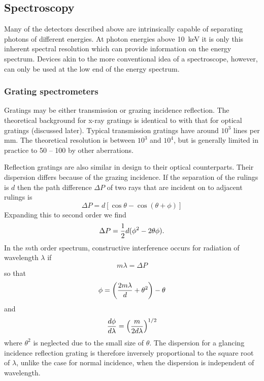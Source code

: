 \subsection{Spectroscopy}

Many of the detectors described above are intrinsically capable of separating 
photons of different energies. At photon energies above 10~keV it is only this
inherent spectral resolution which can provide information on the energy spectrum.
Devices akin to the more conventional idea of a spectroscope, however, can only 
be used at the low end of the energy spectrum.

\subsubsection{Grating spectrometers}
Gratings may be either transmission or grazing
incidence reflection. The theoretical background for x-ray gratings is identical
to with that for optical gratings (discussed later). Typical transmission
gratings have around $10^3$ lines per mm. The theoretical resolution is
between $10^3$ and $10^4$, but is generally limited in practice to 50 -- 100 by
other aberrations.

Reflection gratings are also similar in design to their optical counterparts.
Their dispersion differs because of the grazing incidence. If the separation
of the rulings is $d$ then the path difference $\Delta P$ of two rays that
are incident on to adjacent rulings is
\[
\Delta P=d[\cos\theta-\cos(\theta+\phi)]
\]
Expanding this to second order we find
\[
\Delta P={1\over 2}d(\phi^2-2\theta\phi).
\]
In the $m$th order spectrum, constructive interference occurs for radiation
of wavelength $\lambda$ if 
\[
m\lambda=\Delta P
\]
so that
\[
\phi=\left({{2m\lambda\over d}+\theta^2}\right)-\theta
\]
and
\[
{d\phi\over d\lambda}=\left({m\over 2d\lambda}\right)^{1/2}
\]
where $\theta^2$ is neglected due to the small size of $\theta$. The
dispersion for a glancing incidence reflection grating is therefore inversely
proportional to the square root of $\lambda$, unlike the case for normal 
incidence, when the dispersion is independent of wavelength.

